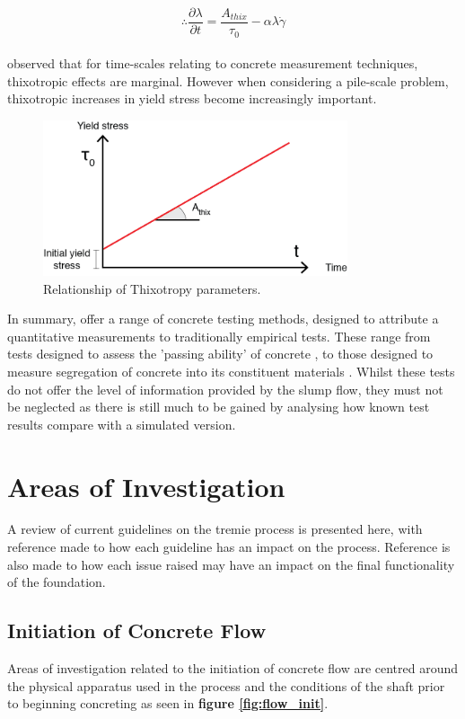 \begin{equation}
\therefore
\frac{\partial \lambda}{\partial t}=\frac{A_{thix}}{\tau_0}-\alpha\lambda\dot{\gamma}
\label{eq:thixdt}
\end{equation}
\\
\citet{roussel07} observed that for time-scales relating to concrete measurement techniques, thixotropic effects are marginal. However when considering a pile-scale problem, thixotropic increases in yield stress become increasingly important.\\
\newline
\begin{figure}[H]
\centering
\includegraphics[width=0.8\textwidth]{thix.png}
\caption{\label{fig:thix} Relationship of Thixotropy parameters.}
\end{figure}
\noindent
In summary, \citet{Sperwall} offer a range of concrete testing methods, designed to attribute a quantitative measurements to traditionally empirical tests. These range from tests designed to assess the 'passing ability' of concrete \citeauthor{BS1235010}, to those designed to measure segregation of concrete into its constituent materials \citeauthor{ASTMbleed}. Whilst these tests do not offer the level of information provided by the slump flow, they must not be neglected as there is still much to be gained by analysing how known test results compare with a simulated version.
\section{Areas of Investigation}
A review of current guidelines on the tremie process is presented here, with reference made to how each guideline has an impact on the process. Reference is also made to how each issue raised may have an impact on the final functionality of the foundation.

\subsection{Initiation of Concrete Flow}
Areas of investigation related to the initiation of concrete flow are centred around the physical apparatus used in the process and the conditions of the shaft prior to beginning concreting as seen in {\bfseries figure \ref{fig:flow_init}}.\\

